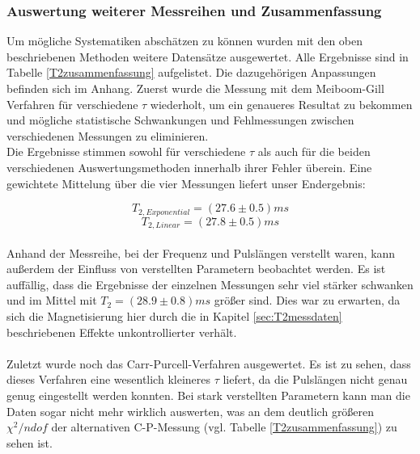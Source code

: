 \documentclass[12pt,a4paper]{article}
\begin{document}
\subsubsection{Auswertung weiterer Messreihen und Zusammenfassung}

Um mögliche Systematiken abschätzen zu können wurden mit den oben beschriebenen Methoden weitere Datensätze ausgewertet. Alle Ergebnisse sind in Tabelle \ref{T2zusammenfassung} aufgelistet. Die dazugehörigen Anpassungen befinden sich im Anhang.
Zuerst wurde die Messung mit dem Meiboom-Gill Verfahren für verschiedene $\tau$ wiederholt, um ein genaueres Resultat zu bekommen und mögliche statistische Schwankungen und Fehlmessungen zwischen verschiedenen Messungen zu eliminieren.\\
Die Ergebnisse stimmen sowohl für verschiedene $\tau$ als auch für die beiden verschiedenen Auswertungsmethoden innerhalb ihrer Fehler überein. 	Eine gewichtete Mittelung über die vier Messungen liefert unser Endergebnis:

\begin{equation*}
\boxed{T_{2, Exponential} = (27.6\pm 0.5)ms}
\end{equation*}
\begin{equation*}
\boxed{T_{2, Linear} = (27.8\pm 0.5)ms}
\end{equation*}\\

Anhand der Messreihe, bei der Frequenz und Pulslängen verstellt waren, kann außerdem der Einfluss von verstellten Parametern beobachtet werden. Es ist auffällig, dass die Ergebnisse der einzelnen Messungen sehr viel stärker schwanken und im Mittel mit $T_2 = (28.9\pm0.8)ms$ größer sind. Dies war zu erwarten, da sich die Magnetisierung hier durch die in Kapitel \ref{sec:T2messdaten} beschriebenen Effekte unkontrollierter verhält.\\
\\
Zuletzt wurde noch das Carr-Purcell-Verfahren ausgewertet. Es ist zu sehen, dass dieses Verfahren eine wesentlich kleineres $\tau$ liefert, da die Pulslängen nicht genau genug eingestellt werden konnten. Bei stark verstellten Parametern kann man die Daten sogar nicht mehr wirklich auswerten, was an dem deutlich größeren $\chi^2/ndof$ der alternativen C-P-Messung (vgl. Tabelle \ref{T2zusammenfassung}) zu sehen ist.
\end{document}
